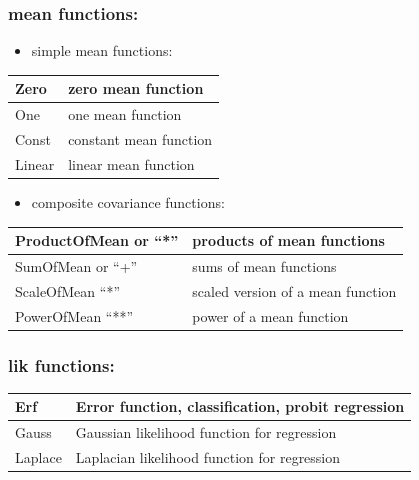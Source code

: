 \documentclass[letterpaper,10pt,english]{sphinxmanual}
\begin{document}
\subsubsection{mean functions:}
\label{functionality:mean-functions}\begin{itemize}
\item {} 
simple mean functions:

\end{itemize}

\begin{tabulary}{\linewidth}{|L|L|}
\hline

Zero
 & 
zero mean function
\\\hline

One
 & 
one mean function
\\\hline

Const
 & 
constant mean function
\\\hline

Linear
 & 
linear mean function
\\\hline
\end{tabulary}

\begin{itemize}
\item {} 
composite covariance functions:

\end{itemize}

\begin{tabulary}{\linewidth}{|L|L|}
\hline

ProductOfMean or ``*''
 & 
products of mean functions
\\\hline

SumOfMean or ``+''
 & 
sums of mean functions
\\\hline

ScaleOfMean ``*''
 & 
scaled version of a mean function
\\\hline

PowerOfMean ``**''
 & 
power of a mean function
\\\hline
\end{tabulary}



\subsubsection{lik functions:}
\label{functionality:lik-functions}
\begin{tabulary}{\linewidth}{|L|L|}
\hline

Erf
 & 
Error function, classification, probit regression
\\\hline

Gauss
 & 
Gaussian likelihood function for regression
\\\hline

Laplace
 & 
Laplacian likelihood function for regression
\\\hline
\end{tabulary}
\end{document}
